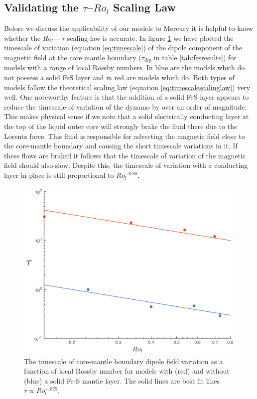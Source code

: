 \subsection{Validating the $\tau$--$Ro_{l}$ Scaling Law}
Before we discuss the applicability of our models to Mercury it is helpful to know whether the $Ro_l - \tau$ scaling law is accurate. In figure \ref{fig:tauscale} we have plotted the timescale of variation (equation \ref{eq:timescale}) of the dipole component of the magnetic field at the core mantle boundary ($\tau_{dip}$ in table \ref{tab:fesresults}) for models with a range of local Rossby numbers. In blue are the models which do not possess a solid FeS layer and in red are models which do. Both types of models follow the theoretical scaling law (equation \ref{eq:timescalescalinglaw}) very well. One noteworthy feature is that the addition of a solid FeS layer appears to reduce the timescale of variation of the dynamo by over an order of magnitude. This makes physical sense if we note that a solid electrically conducting layer at the top of the liquid outer core will strongly brake the fluid there due to the Lorentz force. This fluid is responsible for advecting the magnetic field close to the core-mantle boundary and causing the short timescale variations in it. If these flows are braked it follows that the timescale of variation of the magnetic field should also slow. Despite this, the timescale of variation with a conducting layer in place is still proportional to $Ro_l^{-0.88}$. 
\begin{figure}
	\centering
        \includegraphics[width=.75\textwidth]{Chapter5/Figures/roltau.pdf}
        \caption{The timescale of core-mantle boundary dipole field variation as a function of local Rossby number for models with (red) and without (blue) a solid Fe-S mantle layer. The solid lines are best fit lines $\tau \propto  Ro_{l}^{-.875}$.}
        \label{fig:tauscale}
\end{figure}

